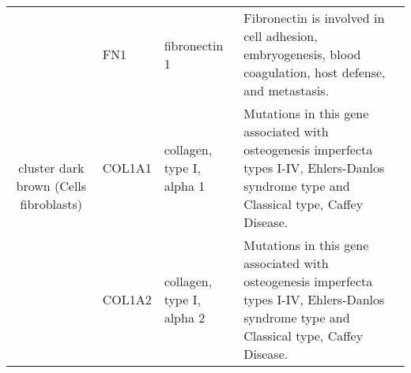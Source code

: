 \begin{table}[htdp]
\begin{center}
\begin{tabular}{|c|p{0.5in}|p{1.4in}|p{3.6in}|}
 \hline
 \multirow{3}{4em}{\small{cluster dark brown (Cells fibroblasts)}} & \small{FN1}  & \footnotesize{fibronectin 1} & \scriptsize{Fibronectin is involved in cell adhesion, embryogenesis, blood coagulation, host defense, and metastasis.} \\
 					      & \small{COL1A1} & \footnotesize{collagen, type I, alpha 1} & \scriptsize{Mutations in this gene associated with osteogenesis imperfecta types I-IV, Ehlers-Danlos syndrome type and Classical type, Caffey Disease}. \\
					      & \small{COL1A2} & \footnotesize{collagen, type I, alpha 2} & \scriptsize{Mutations in this gene associated with osteogenesis imperfecta types I-IV, Ehlers-Danlos syndrome type and Classical type, Caffey Disease}. \\
\hline
\end{tabular}
 \end{center}
 \label{tab:tab1}
\end{table}



